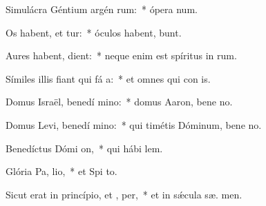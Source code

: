 \item Simulácra Géntium argén  rum:~* ópera  num.
\item Os habent, et  tur:~* óculos habent,   bunt.
\item Aures habent,   dient:~* neque enim est spíritus in  rum.
\item Símiles illis fiant qui fá a:~* et omnes qui con  is.
\item Domus Israël, benedí mino:~* domus Aaron, bene no.
\item Domus Levi, benedí mino:~* qui timétis Dóminum, bene no.
\item Benedíctus Dómi  on,~* qui hábi  lem.
\item Glória Pa,  lio,~* et Spi to.
\item Sicut erat in princípio, et ,  per,~* et in sǽcula sæ. men.
